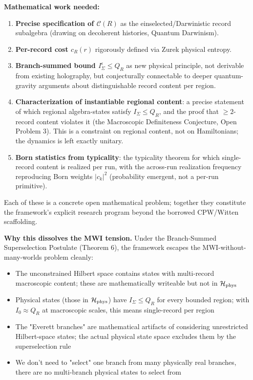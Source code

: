\documentclass[11pt,a4paper]{article}
\begin{document}
\textbf{Mathematical work needed:}

\begin{enumerate}
  \item \textbf{Precise specification of $\mathcal{C}(R)$} as the einselected/Darwinistic record subalgebra (drawing on decoherent histories, Quantum Darwinism).
  \item \textbf{Per-record cost $c_R(r)$} rigorously defined via Zurek physical entropy.
  \item \textbf{Branch-summed bound $I_\Sigma^\epsilon \le Q_R$} as new physical principle, not derivable from existing holography, but conjecturally connectable to deeper quantum-gravity arguments about distinguishable record content per region.
  \item \textbf{Characterization of instantiable regional content}: a precise statement of which regional algebra-states satisfy $I_\Sigma \le Q_R$, and the proof that $\ge 2$-record content violates it (the Macroscopic Definiteness Conjecture, Open Problem 3). This is a constraint on regional content, not on Hamiltonians; the dynamics is left exactly unitary.
  \item \textbf{Born statistics from typicality}: the typicality theorem for which single-record content is realized per run, with the across-run realization frequency reproducing Born weights $|c_k|^2$ (probability emergent, not a per-run primitive).
\end{enumerate}

Each of these is a concrete open mathematical problem; together they constitute the framework's explicit research program beyond the borrowed CPW/Witten scaffolding.

\textbf{Why this dissolves the MWI tension.} Under the Branch-Summed Superselection Postulate (Theorem 6), the framework escapes the MWI-without-many-worlds problem cleanly:

\begin{itemize}
  \item The unconstrained Hilbert space contains states with multi-record macroscopic content; these are mathematically writeable but not in $\mathcal{H}_{\rm phys}$
  \item Physical states (those in $\mathcal{H}_{\rm phys}$) have $I_\Sigma \le Q_R$ for every bounded region; with $I_0 \approx Q_R$ at macroscopic scales, this means single-record per region
  \item The "Everett branches" are mathematical artifacts of considering unrestricted Hilbert-space states; the actual physical state space excludes them by the superselection rule
  \item We don't need to "select" one branch from many physically real branches, there are no multi-branch physical states to select from
\end{itemize}
\end{document}
